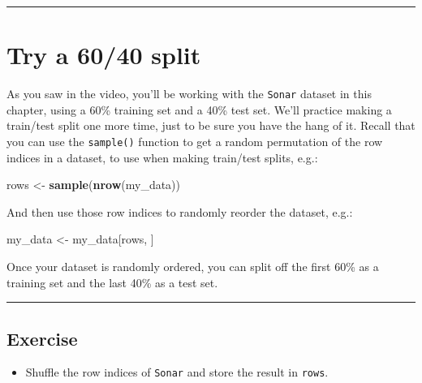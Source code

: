 \documentclass[
]{book}
\newenvironment{Shaded}{\begin{snugshade}}{\end{snugshade}}
\newcommand{\KeywordTok}[1]{\textcolor[rgb]{0.13,0.29,0.53}{\textbf{#1}}}
\newcommand{\NormalTok}[1]{#1}
\newcommand{\StringTok}[1]{\textcolor[rgb]{0.31,0.60,0.02}{#1}}
\providecommand{\tightlist}{%
  \setlength{\itemsep}{0pt}\setlength{\parskip}{0pt}}
\begin{document}
\begin{center}\rule{0.5\linewidth}{0.5pt}\end{center}

\hypertarget{try-a-6040-split}{%
\section{Try a 60/40 split}\label{try-a-6040-split}}

As you saw in the video, you'll be working with the \texttt{Sonar} dataset in this chapter, using a 60\% training set and a 40\% test set. We'll practice making a train/test split one more time, just to be sure you have the hang of it. Recall that you can use the \texttt{sample()} function to get a random permutation of the row indices in a dataset, to use when making train/test splits, e.g.:

\begin{Shaded}
\begin{Highlighting}[]
\NormalTok{rows <-}\StringTok{ }\KeywordTok{sample}\NormalTok{(}\KeywordTok{nrow}\NormalTok{(my_data))}
\end{Highlighting}
\end{Shaded}

And then use those row indices to randomly reorder the dataset, e.g.:

\begin{Shaded}
\begin{Highlighting}[]
\NormalTok{my_data <-}\StringTok{ }\NormalTok{my_data[rows, ]}
\end{Highlighting}
\end{Shaded}

Once your dataset is randomly ordered, you can split off the first 60\% as a training set and the last 40\% as a test set.

\begin{center}\rule{0.5\linewidth}{0.5pt}\end{center}

\hypertarget{exercise-9}{%
\subsection*{Exercise}\label{exercise-9}}

\begin{itemize}
\tightlist
\item
  Shuffle the row indices of \texttt{Sonar} and store the result in \texttt{rows}.
\end{itemize}
\end{document}

